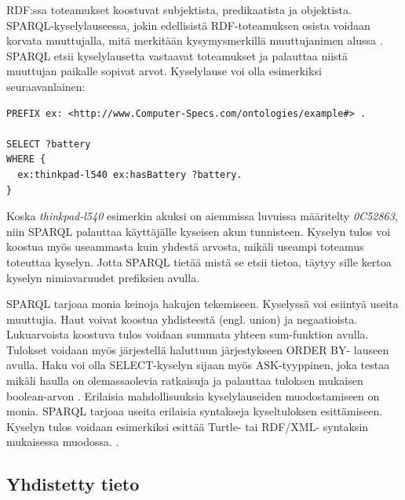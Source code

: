 \documentclass[finnish, 12pt, a4paper, elec, utf8, pdfa, online]{aaltothesis}
\begin{document}
{RDF:ssa toteamukset koostuvat subjektista, predikaatista ja objektista. SPARQL-kyselylauseessa, jokin edellisistä RDF-toteamuksen osista voidaan korvata muuttujalla, mitä merkitään kysymysmerkillä muuttujanimen alussa \cite{Antoniou}. SPARQL etsii kyselylausetta vastaavat toteamukset ja palauttaa niistä muuttujan paikalle sopivat arvot. Kyselylause voi olla esimerkiksi seuraavanlainen:

\begin{lstlisting}[style=codeblock]
PREFIX ex: <http://www.Computer-Specs.com/ontologies/example#> .

SELECT ?battery
WHERE {
  ex:thinkpad-l540 ex:hasBattery ?battery.
}
\end{lstlisting}

Koska \textit{thinkpad-l540} esimerkin akuksi on aiemmissa luvuissa määritelty \textit{0C52863}, niin SPARQL palauttaa käyttäjälle kyseisen akun tunnisteen. Kyselyn tulos voi koostua myös useammasta kuin yhdestä arvosta, mikäli useampi toteamus toteuttaa kyselyn. Jotta SPARQL tietää mistä se etsii tietoa, täytyy sille kertoa kyselyn nimiavaruudet prefiksien avulla.

SPARQL tarjoaa monia keinoja hakujen tekemiseen. Kyselyssä voi esiintyä useita muuttujia.
Haut voivat koostua yhdisteestä (engl. union) ja negaatioista. Lukuarvoista koostuva tulos voidaan summata yhteen sum-funktion avulla. Tulokset voidaan myös järjestellä haluttuun järjestykseen ORDER BY- lauseen avulla. Haku voi olla SELECT-kyselyn sijaan myös ASK-tyyppinen, joka testaa mikäli haulla on olemassaolevia ratkaisuja ja palauttaa tuloksen mukaisen boolean-arvon \cite{sparql_query}. Erilaisia mahdollisuuksia kyselylauseiden muodostamiseen on monia. SPARQL tarjoaa useita erilaisia syntakseja kyseltuloksen esittämiseen. Kyselyn tulos voidaan esimerkiksi esittää Turtle- tai RDF/XML- syntaksin mukaisessa muodossa. \cite{W3C_turtle}.


\clearpage

\subsection{Yhdistetty tieto}

}
\end{document}
